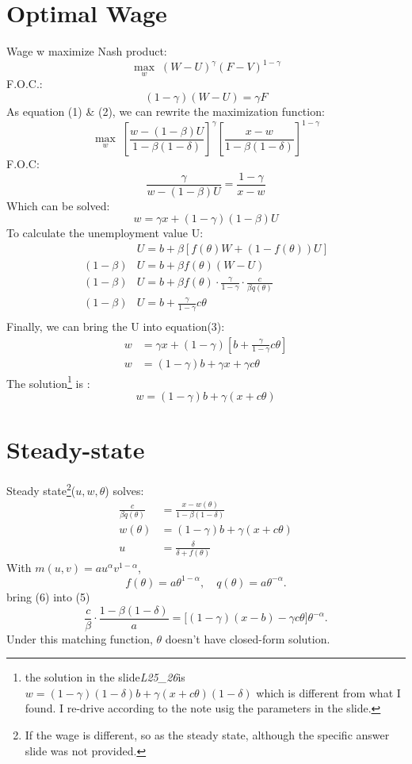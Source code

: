 \documentclass[12pt,a4paper]{article}
\begin{document}
\section{Optimal Wage}
	Wage w maximize Nash product:
	\[
	\max_w \; (W - U)^\gamma (F - V)^{1-\gamma}
	\]
	F.O.C.:
	\[
	(1-\gamma)(W - U) = \gamma F
	\]
	As equation (1) \& (2), we can rewrite the maximization function:
	\[
	\max_w \; \left[ \frac{w - (1-\beta)U}{1 - \beta(1-\delta)} \right]^\gamma 
	\left[ \frac{x - w}{1 - \beta(1-\delta)} \right]^{1-\gamma}
	\]
	F.O.C:
	\[
	\frac{\gamma}{w - (1-\beta)U} = \frac{1 - \gamma}{x - w}
	\]
	Which can be solved:
	\begin{equation}
		w = \gamma x + (1-\gamma)(1-\beta)U
	\end{equation}
	To calculate the unemployment value U:
	\begin{align*}
		&U = b + \beta \left[ f(\theta) W + (1 - f(\theta)) U \right] \\
		(1-\beta)&U = b + \beta f(\theta)(W - U) \\
		(1-\beta)&U = b + \beta f(\theta) \cdot \frac{\gamma}{1-\gamma} \cdot \frac{c}{\beta q(\theta)} \\
		(1-\beta)&U = b + \frac{\gamma}{1-\gamma} c \theta \\ 
	\end{align*}
	Finally, we can bring the U into equation(3):
	\begin{align*}
	w &= \gamma x + (1-\gamma) \left[ b + \frac{\gamma}{1-\gamma} c \theta \right] \\
	w &= (1-\gamma)b + \gamma x + \gamma c \theta
	\end{align*}
	The solution\footnote{the solution in the slide\textit{L25\_26}is  \(w = (1-\gamma)(1-\delta)b + \gamma(x + c\theta)(1-\delta) \) which is different from what I found. I re-drive according to the note usig the parameters in the slide.} is :
	\begin{equation}
		\boxed{w = (1-\gamma)b + \gamma(x + c\theta)} 
	\end{equation}

\section{Steady-state} 
	Steady state\footnote{If the wage is different, so as the steady state, although the specific answer slide was not provided.}($u,w,\theta$) solves:
	\begin{align}
		\frac{c}{\beta q(\theta)} &= \frac{x - w(\theta)}{1 - \beta(1 - \delta)}   \\
		w(\theta) &= (1-\gamma)b + \gamma(x + c\theta) \\
		u &= \frac{\delta}{\delta + f(\theta)}
	\end{align}
	With \(m(u, v) = a u^{\alpha} v^{1-\alpha}\),
	\[
	f(\theta) = a \theta^{1-\alpha}, \quad q(\theta) = a \theta^{-\alpha}.
	\]
	bring (6) into (5)
	\[
	\frac{c}{\beta} \cdot \frac{1 - \beta(1-\delta)}{a} = \bigl[ (1-\gamma)(x - b) - \gamma c \theta \bigr] \theta^{-\alpha}.
	\]
	Under this matching function, $\theta$ doesn't have closed-form solution.
	
\end{document}
